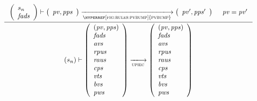 \begin{figure}[htb]
  \begin{equation}
    \label{eq:rule:upi-ec-pv-unchanged}
    \inference
    {
      {\left(\begin{array}{l}
         s_n\\
         \var{fads}
       \end{array}\right)}
      \vdash
      {
        \left(
          \begin{array}{l}
            \var{pv}, \var{pps}
          \end{array}
        \right)
      }
      \trans{\hyperref[fig:rules:pvbump]{pvbump}}{}
      {
        \left(
          \begin{array}{l}
            \var{pv'}, \var{pps'}\\
          \end{array}
        \right)
      } &\var{pv} = \var{pv'}
    }
    {
      (s_n)
      \vdash
      {
        \left(
          \begin{array}{l}
            (\var{pv}, \var{pps})\\
            \var{fads}\\
            \var{avs}\\
            \var{rpus}\\
            \var{raus}\\
            \var{cps}\\
            \var{vts}\\
            \var{bvs}\\
            \var{pws}
          \end{array}
        \right)
      }
      \trans{upiec}{}
      {
        \left(
          \begin{array}{l}
            (\var{pv}, \var{pps})\\
            \var{fads}\\
            \var{avs}\\
            \var{rpus}\\
            \var{raus}\\
            \var{cps}\\
            \var{vts}\\
            \var{bvs}\\
            \var{pws}
          \end{array}
        \right)
      }
    }
  \end{equation}
  \nextdef
  \begin{equation}
    \label{eq:rule:upi-ec-pv-change}

\end{equation}
\end{figure}
